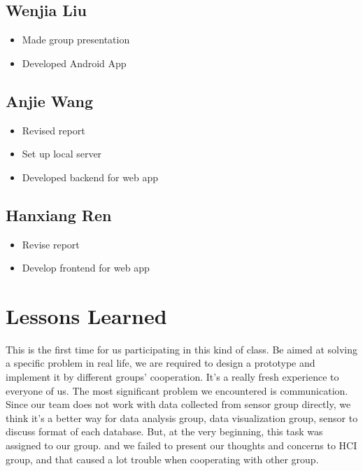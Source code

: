 \documentclass{article}
\begin{document}
\subsection{Wenjia Liu}
\begin{itemize}
	\item Made group presentation
	\item Developed Android App
\end{itemize}

\subsection{Anjie Wang}
\begin{itemize}
	\item Revised report
	\item Set up local server 
	\item Developed backend for web app
\end{itemize}

\subsection{Hanxiang Ren}
\begin{itemize}
	\item Revise report
	\item Develop frontend for web app
\end{itemize}

\section{Lessons Learned}
This is the first time for us participating in this kind of class. Be aimed at solving a specific problem in real life, we are required to design a prototype and implement it by different groups’ cooperation. It’s a really fresh experience to everyone of us. \newline
The most significant problem we encountered is communication. Since our team does not work with data collected from sensor group directly, we think it's a better way for data analysis group, data visualization group, sensor to discuss format of each database. But, at the very beginning, this task was assigned to our group. and we failed to present our thoughts and concerns to HCI group, and that caused a lot trouble when cooperating with other group.
\end{document}
